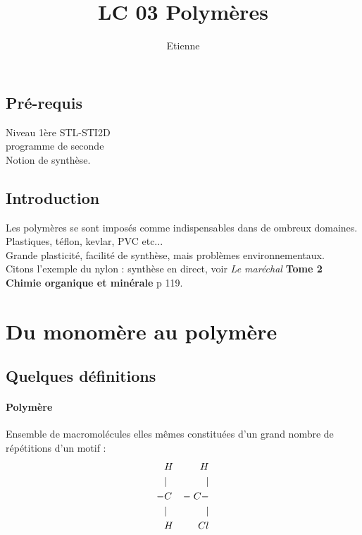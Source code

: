 \documentclass[12pt,prb,aps,epsf]{report}
\begin{document}
	
	\title{LC 03 Polymères}
	\author{Etienne}
	
	\maketitle
	
	\tableofcontents
	
	\pagebreak
	
\subsection{Pré-requis}
Niveau 1ère STL-STI2D\\
programme de seconde\\
Notion de synthèse.

\subsection{Introduction}
Les polymères se sont imposés comme indispensables dans de ombreux domaines. Plastiques, téflon, kevlar, PVC etc...\\
Grande plasticité, facilité de synthèse, mais problèmes environnementaux.\\
Citons l'exemple du nylon : synthèse en direct, voir \textit{Le maréchal} \textbf{Tome 2 Chimie organique et minérale} p 119.

\section{Du monomère au polymère}
\subsection{Quelques définitions}
\paragraph{Polymère} Ensemble de macromolécules elles mêmes constituées d'un grand nombre de répétitions d'un motif :
\begin{eqnarray}
&H&\hspace{0.45cm}H \nonumber \\
&|&\hspace{0.5cm}| \nonumber \\
-&C&-\;C-\\
&|&\hspace{0.5cm}| \nonumber \\
&H& \hspace{0.45cm}Cl \nonumber 
\end{eqnarray}
\end{document}
